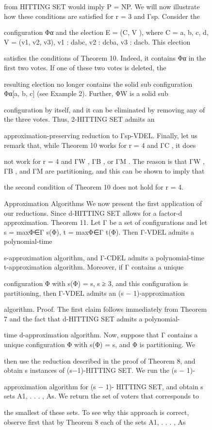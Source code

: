 \documentclass[12pt, a4paper]{report}
\begin{document}
\begin{figure}[ht!]
from HITTING SET would imply P = NP. We will now illustrate how these conditions are satisfied for r = 3 and Γsp. Consider the 

configuration Φα and the election E = (C, V ), where C = {a, b, c, d}, V = (v1, v2, v3), v1 : dabc, v2 : dcba, v3 : dacb. This election 

satisfies the conditions of Theorem 10. Indeed, it contains Φα in the first two votes. If one of these two votes is deleted, the 

resulting election no longer contains the solid sub configuration Φα[{a, b, c}] (see Example 2). Further, ΦW is a solid sub 

configuration by itself, and it can be eliminated by removing any of the three votes. Thus, 2-HITTING SET admits an 

approximation-preserving reduction to Γsp-VDEL. Finally, let us remark that, while Theorem 10 works for r = 4 and ΓC , it does 

not work for r = 4 and ΓW , ΓB , or ΓM . The reason is that ΓW , ΓB , and ΓM are partitioning, and this can be shown to imply that 

the second condition of Theorem 10 does not hold for r = 4.

Approximation Algorithms
 We now present the first application of our reductions. Since d-HITTING SET allows for a factor-d approximation. 
Theorem 11. Let Γ be a set of configurations and let s = maxΦ∈Γ s(Φ), t = maxΦ∈Γ t(Φ). Then Γ-VDEL admits a polynomial-time 

s-approximation algorithm, and Γ-CDEL admits a polynomial-time t-approximation algorithm. Moreover, if Γ contains a unique 

configuration Φ with s(Φ) = s, s ≥ 3, and this configuration is partitioning, then Γ-VDEL admits an (s − 1)-approximation 

algorithm. Proof. The first claim follows immediately from Theorem 7 and the fact that d-HITTING SET admits a polynomial-

time d-approximation algorithm. Now, suppose that Γ contains a unique configuration Φ with s(Φ) = s, and Φ is partitioning. We 

then use the reduction described in the proof of Theorem 8, and obtain s instances of (s−1)-HITTING SET. We run the (s − 1)-

approximation algorithm for (s − 1)- HITTING SET, and obtain s sets A1, . . . , As. We return the set of voters that corresponds to 

the smallest of these sets. To see why this approach is correct, observe first that by Theorem 8 each of the sets A1, . . . , As 


\end{figure}
\end{document}

